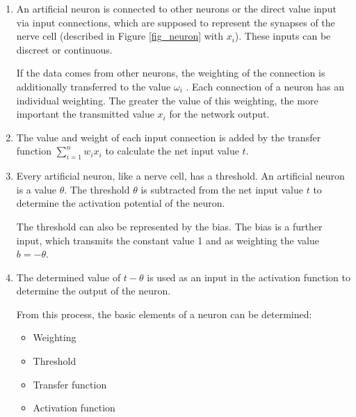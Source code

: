 \begin{enumerate}

  \item An artificial neuron is connected to other neurons
        or the direct value input via input connections,
        which are supposed to represent the synapses of the
        nerve cell (described in Figure \ref{fig_neuron}
        with $x_i$). These inputs can be discreet or
        continuous.\cite{nne_beck}

        If the data comes from other neurons, the weighting
        of the connection is additionally transferred to
        the value $\omega_i$ . Each connection of a neuron
        has an individual weighting. The greater the value
        of this weighting, the more important the
        transmitted value $x_i$ for the network output.

  \item The value and weight of each input connection is
        added by the transfer function $\sum_{i=1}^{n}w_ix_i$
        to calculate the net input value $t$.


  \item Every artificial neuron, like a nerve cell, has a
        threshold. An artificial neuron is a value
        $\theta$. The threshold $\theta$ is subtracted from
        the net input value $t$ to determine the activation
        potential of the neuron.

        The threshold can also be represented by the bias.
        The bias is a further input, which transmits the
        constant value 1 and as weighting the value
        $b=-\theta$.

        

  \item The determined value of $t-\theta$ is used as an
        input in the activation function to determine the
        output of the neuron.

        From this process, the basic elements of a neuron
        can be determined:

        \begin{itemize}

          \item Weighting

          \item Threshold

          \item Transfer function

          \item Activation function

        \end{itemize}

\end{enumerate}

